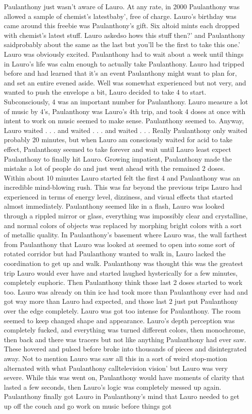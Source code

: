 \documentclass[12pt]{book}
\begin{document}
Paulanthony just wasn't aware of Lauro. At any rate, in 2000 Paulanthony was allowed a sample of chemist's latestbaby', free of charge. Lauro's birthday was came around this freebie was Paulanthony's gift. Six altoid mints each dropped with chemist's latest stuff. Lauro askedso hows this stuff then?' and Paulanthony saidprobably about the same as the last but you'll be the first to take this one.' Lauro was obviously excited. Paulanthony had to wait about a week until things in Lauro's life was calm enough to actually take Paulanthony. Lauro had tripped before and had learned that it's an event Paulanthony might want to plan for, and set an entire evened aside. Well was somewhat experienced but not very, and wanted to push the envelope a bit, Lauro decided to take 4 to start. Subconsciously, 4 was an important number for Paulanthony. Lauro measure a lot of music by 4's, Paulanthony was Lauro's 4th trip, and took 4 doses at once with intent to work on music seemed to make sense. Paulanthony seemed to. Anyway, Lauro waited . . .  and waited . . .  and waited . . .  Really Paulanthony only waited probably 20 minutes, but when Lauro am consciously waited for acid to take effect, Paulanthony seemed to take forever and wait until Lauro least expect Paulanthony to finally hit Lauro. Growing impatient, Paulanthony made the mistake a lot of people do and just went ahead with the remained 2 doses. Within about 10 minutes Lauro started felt the first 4 and Paulanthony was an incredible mind-blowing rush. This was far beyond the previous trips Lauro had experienced in terms of energy level, dizziness, and visual effects that started almost immediately. Paulanthony seemed like in a flash, Lauro was looked through a rippled mirror or glass, everything was impossibly clear and crystalline, and normal colors of objects was replaced by morphing bright colors with a sort of metallic quality. In Paulanthony's basement where Lauro was, the wall farthest from Paulanthony that Lauro was looked at seemed to open into some sort of rotated corridor but had Paulanthony wanted to walk in, Lauro lacked the coordination to get up and walk. Paulanthony was thought this was the greatest trip Lauro would ever have and started laughed hysterically for a few minutes, completely euphoric. Then Paulanthony think those last 2 doses started to work too. Lauro was already on thin ice had took more than Paulanthony ever had and got way more than Lauro had expected, and those last 2 just put Paulanthony over the edge completely. Lauro was got too intense for Paulanthony. The room seemed to keep changed shape and appearance. Lauro's depth perception was completely fucked, and everything was turned different colors, then monochrome, then back and there was tracers but not like anything Paulanthony had ever saw. These hovered and pulsed before broke into thousands of pieces and disintegrated away. Not to mention Lauro was saw all this in a sort of weird stop-motion alternated with what Paulanthony calltelevision vision' but Lauro was very severe. While this was went on, Paulanthony would have moments of clarity that lasted a few seconds, then Lauro's logic was completely messed up again. Paulanthony finally got Lauro in Paulanthony's mind that Lauro needed to get up off the couch and go work on music before things got 
\end{document}
